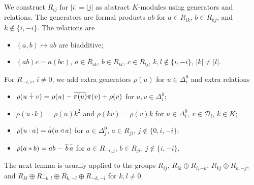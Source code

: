 \documentclass{article}
\theoremstyle{definition}
\newcommand{\inv}[1]{
    \!\;\overline{
        \!\!\:#1\vphantom !\!\!\:
    }\;\!
}
\begin{document}
We construct \(R_{ij}\) for \(|i| = |j|\) as abstract \(K\)-modules using generators and relations. The generators are formal products \(ab\) for \(a \in R_{ik}\), \(b \in R_{kj}\), and \(
    k \notin \{i, -i\}
\). The relations are
\begin{itemize}

    \item \(
        (a, b) \mapsto ab
    \) are biadditive;

    \item \(
        (ab)c = a(bc)
    \), \(a \in R_{ik}\), \(b \in R_{kl}\), \(c \in R_{lj}\), \(
        k, l \notin \{i, -i\}
    \), \(|k| \neq |l|\).

\end{itemize}
For \(R_{-i, i}\), \(i \neq 0\), we add extra generators \(\rho(u)\) for \(u \in \Delta^0_i\) and extra relations
\begin{itemize}

    \item \(
        \rho(u \dotplus v)
        =
        \rho(u) - \inv{\pi(u)} \pi(v) + \rho(v)
    \) for \(u, v \in \Delta^0_i\);

    \item \(
        \rho(u \cdot k) = \rho(u) k^2
    \) and \(
        \rho(kv) = \rho(v) k
    \) for \(u \in \Delta^0_i\), \(v \in \mathcal D_i\), \(k \in K\);

    \item \(
        \rho(u \cdot a) = \inv a (u \triangleleft a)
    \) for \(u \in \Delta^0_j\), \(a \in R_{ji}\), \(
        j \notin \{0, i, -i\}
    \);

    \item \(
        \rho(a * b) = ab - \inv{\,b\,} \inv a
    \) for \(a \in R_{-i, j}\), \(b \in R_{ji}\), \(
        j \notin \{i, -i\}
    \).

\end{itemize}

The next lemma is usually applied to the groups \(R_{ij}\), \(
    R_{ik} \oplus R_{i, -k}
\), \(
    R_{kj} \oplus R_{k, -j}
\), and \(
    R_{kl} \oplus R_{-k, l}
        \oplus R_{k, -l} \oplus R_{-k, -l}
\) for \(k, l \neq 0\).
\end{document}
